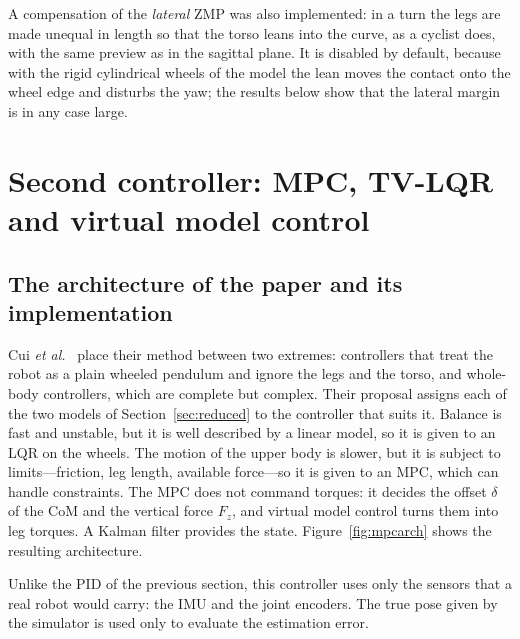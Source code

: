\documentclass[11pt,a4paper]{article}
\begin{document}
A compensation of the \emph{lateral} ZMP was also implemented: in a turn the legs are made unequal in length so
that the torso leans into the curve, as a cyclist does, with the same preview as in the sagittal plane. It is
disabled by default, because with the rigid cylindrical wheels of the model the lean moves the contact onto the
wheel edge and disturbs the yaw; the results below show that the lateral margin is in any case large.

\section{Second controller: MPC, TV-LQR and virtual model control}
\label{sec:mpc}

\subsection{The architecture of the paper and its implementation}

Cui \emph{et al.}~\cite{cui2022} place their method between two extremes: controllers that treat the robot as a
plain wheeled pendulum and ignore the legs and the torso, and whole-body controllers, which are complete but
complex. Their proposal assigns each of the two models of Section~\ref{sec:reduced} to the controller that suits
it. Balance is fast and unstable, but it is well described by a linear model, so it is given to an LQR on the
wheels. The motion of the upper body is slower, but it is subject to limits---friction, leg length, available
force---so it is given to an MPC, which can handle constraints. The MPC does not command torques: it decides the
offset $\delta$ of the CoM and the vertical force $F_z$, and virtual model control turns them into leg torques.
A Kalman filter provides the state. Figure~\ref{fig:mpcarch} shows the resulting architecture.

Unlike the PID of the previous section, this controller uses only the sensors that a real robot would carry: the
IMU and the joint encoders. The true pose given by the simulator is used only to evaluate the estimation error.
\end{document}
